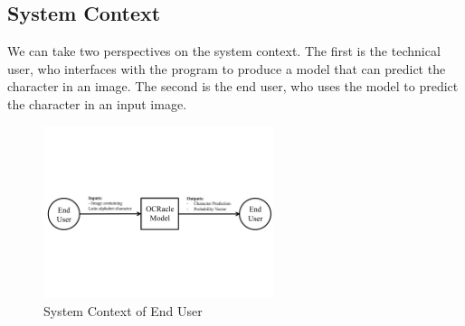 \documentclass[12pt]{article}
\begin{document}
\subsection{System Context}


We can take two perspectives on the system context. The first is the technical
user, who interfaces with the \progname{} program to produce a model that can
predict the character in an image. The second is the end user, who uses the
\progname{} model to predict the character in an input image.

\begin{figure}[h!]
  \begin{center}
    \includegraphics[page=2, width=0.6\textwidth]{SystemContextFigure}
    \caption{System Context of End User}
    \label{Fig_SystemContext2} 
  \end{center}
\end{figure}
\end{document}
